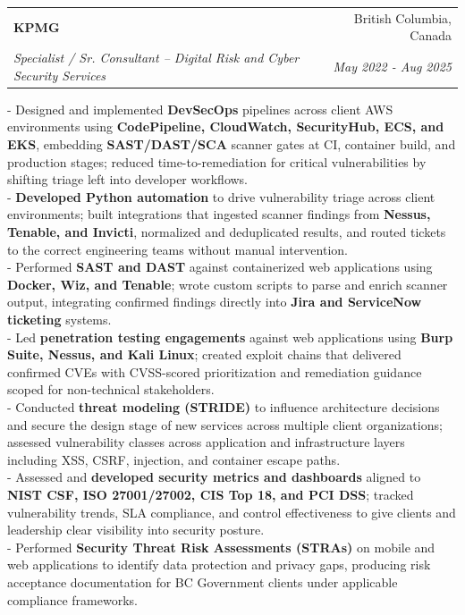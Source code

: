 \documentclass[letterpaper,11pt]{article}
\makeatletter
\newcommand{\resumeSubheading}[4]{
  \vspace{-1pt}\item
    \begin{tabular*}{0.97\textwidth}{l@{\extracolsep{\fill}}r}
      \textbf{#1} & #2 \\
      \textit{\small#3} & \textit{\small #4} \\
    \end{tabular*}\vspace{-5pt}
}
\newcommand{\resumeItemListStart}{\begin{itemize}}
\newcommand{\resumeItemListEnd}{\end{itemize}\vspace{-5pt}}
\makeatother
\begin{document}
    \resumeSubheading
      {KPMG}{British Columbia, Canada}
      {Specialist / Sr. Consultant -- Digital Risk and Cyber Security Services}{May 2022 - Aug 2025}
      \resumeItemListStart
      \vspace{5pt}
          {- Designed and implemented \textbf{DevSecOps} pipelines across client AWS environments using \textbf{CodePipeline, CloudWatch, SecurityHub, ECS, and EKS}, embedding \textbf{SAST/DAST/SCA} scanner gates at CI, container build, and production stages; reduced time-to-remediation for critical vulnerabilities by shifting triage left into developer workflows. \\
           - \textbf{Developed Python automation} to drive vulnerability triage across client environments; built integrations that ingested scanner findings from \textbf{Nessus, Tenable, and Invicti}, normalized and deduplicated results, and routed tickets to the correct engineering teams without manual intervention. \\
           - Performed \textbf{SAST and DAST} against containerized web applications using \textbf{Docker, Wiz, and Tenable}; wrote custom scripts to parse and enrich scanner output, integrating confirmed findings directly into \textbf{Jira and ServiceNow ticketing} systems. \\
           - Led \textbf{penetration testing engagements} against web applications using \textbf{Burp Suite, Nessus, and Kali Linux}; created exploit chains that delivered confirmed CVEs with CVSS-scored prioritization and remediation guidance scoped for non-technical stakeholders. \\
           - Conducted \textbf{threat modeling (STRIDE)} to influence architecture decisions and secure the design stage of new services across multiple client organizations; assessed vulnerability classes across application and infrastructure layers including XSS, CSRF, injection, and container escape paths. \\
           - Assessed and \textbf{developed security metrics and dashboards} aligned to \textbf{NIST CSF, ISO 27001/27002, CIS Top 18, and PCI DSS}; tracked vulnerability trends, SLA compliance, and control effectiveness to give clients and leadership clear visibility into security posture. \\
           - Performed \textbf{Security Threat Risk Assessments (STRAs)} on mobile and web applications to identify data protection and privacy gaps, producing risk acceptance documentation for BC Government clients under applicable compliance frameworks. \\
           }
    \resumeItemListEnd
\end{document}
